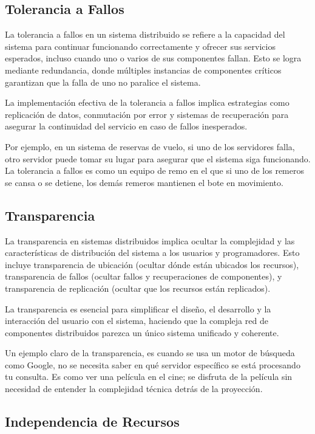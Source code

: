 \subsection{Tolerancia a Fallos}

La tolerancia a fallos en un sistema distribuido se refiere a la capacidad del sistema para continuar funcionando correctamente y ofrecer sus servicios esperados, incluso cuando uno o varios de sus componentes fallan. Esto se logra mediante redundancia, donde múltiples instancias de componentes críticos garantizan que la falla de uno no paralice el sistema.

La implementación efectiva de la tolerancia a fallos implica estrategias como replicación de datos, conmutación por error y sistemas de recuperación para asegurar la continuidad del servicio en caso de fallos inesperados.

Por ejemplo, en un sistema de reservas de vuelo, si uno de los servidores falla, otro servidor puede tomar su lugar para asegurar que el sistema siga funcionando. La tolerancia a fallos es como un equipo de remo en el que si uno de los remeros se cansa o se detiene, los demás remeros mantienen el bote en movimiento.

\subsection{Transparencia}

La transparencia en sistemas distribuidos implica ocultar la complejidad y las características de distribución del sistema a los usuarios y programadores. Esto incluye transparencia de ubicación (ocultar dónde están ubicados los recursos), transparencia de fallos (ocultar fallos y recuperaciones de componentes), y transparencia de replicación (ocultar que los recursos están replicados).

La transparencia es esencial para simplificar el diseño, el desarrollo y la interacción del usuario con el sistema, haciendo que la compleja red de componentes distribuidos parezca un único sistema unificado y coherente.

Un ejemplo claro de la transparencia, es cuando se usa un motor de búsqueda como Google, no se necesita saber en qué servidor específico se está procesando tu consulta. Es como ver una película en el cine; se disfruta de la película sin necesidad de entender la complejidad técnica detrás de la proyección.

\subsection{Independencia de Recursos}

